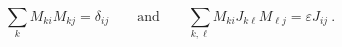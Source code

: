 \begin{equation*}
  \sum_k M_{ki} M_{kj} = \delta_{ij} \qquad \text{and} \qquad
  \sum_{k,\ell} M_{ki} J_{k\ell} M_{\ell j} = \varepsilon J_{ij}~.
\end{equation*}


